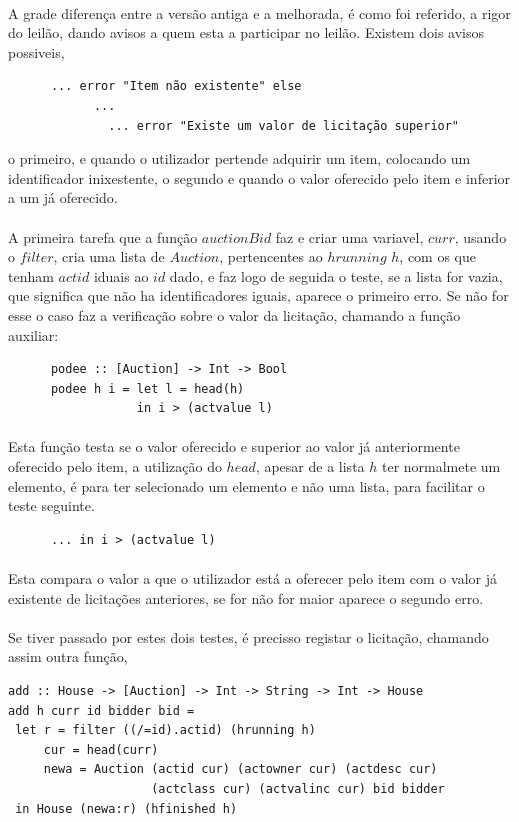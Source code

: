 \documentclass[a4paper]{article}
\begin{document}
\begin{enumerate}
\paragraph{}A grade diferença entre a versão antiga e a melhorada, é como foi referido, a rigor do leilão, dando avisos a quem esta a participar no leilão. Existem dois avisos possiveis,
\begin{verbatim}
      ... error "Item não existente" else 
            ... 
              ... error "Existe um valor de licitação superior"
\end{verbatim}
o primeiro, e quando o utilizador pertende adquirir um item, colocando um identificador inixestente, o segundo e quando o valor oferecido pelo item e inferior a um já oferecido.\\
\paragraph{}A primeira tarefa que a função $auctionBid$ faz e criar uma variavel, $curr$, usando o $filter$, cria uma lista de $Auction$, pertencentes ao $hrunning$ $h$, com os que tenham $actid$ iduais ao $id$ dado, e faz logo de seguida o teste, se a lista for vazia, que significa que não ha identificadores iguais, aparece o primeiro erro. Se não for esse o caso faz a verificação sobre o valor da licitação, chamando a função auxiliar:
\begin{verbatim}
      podee :: [Auction] -> Int -> Bool
      podee h i = let l = head(h)
                  in i > (actvalue l) 
\end{verbatim}
\paragraph{}Esta função testa se o valor oferecido e superior ao valor já anteriormente oferecido pelo item, a utilização do $head$, apesar de a lista $h$ ter normalmete um elemento, é para ter selecionado um elemento e não uma lista, para facilitar o teste seguinte.
\begin{verbatim}
      ... in i > (actvalue l) 
\end{verbatim} 
\paragraph{}Esta compara o valor a que o utilizador está a oferecer pelo item com o valor já existente de licitações anteriores, se for não for maior aparece o segundo erro.
\paragraph{}Se tiver passado por estes dois testes, é precisso registar o licitação, chamando assim outra função,
\begin{verbatim}
add :: House -> [Auction] -> Int -> String -> Int -> House
add h curr id bidder bid = 
 let r = filter ((/=id).actid) (hrunning h)
     cur = head(curr)
     newa = Auction (actid cur) (actowner cur) (actdesc cur) 
                    (actclass cur) (actvalinc cur) bid bidder
 in House (newa:r) (hfinished h)
\end{verbatim}
\newpage

\end{enumerate}
\end{document}
